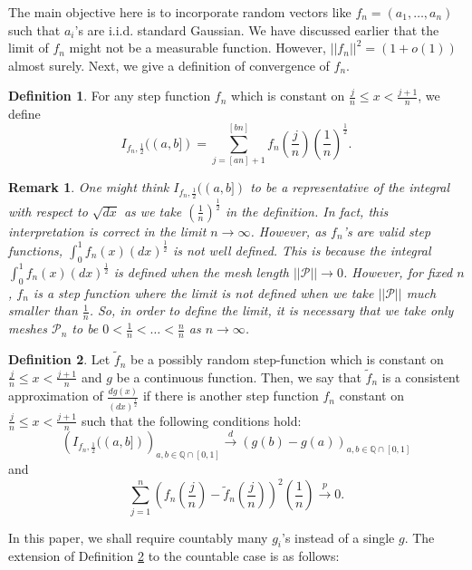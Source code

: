\documentclass[reqno,12pt]{amsart}
\theoremstyle{plain}
\newtheorem{remark}{Remark}
\theoremstyle{definition}
\newtheorem{definition}{Definition}
\let\tilde\widetilde
\begin{document}
\noindent 
The main objective here is to incorporate random vectors like $f_{n}=(a_{1},\ldots, a_{n})$ such that $a_{i}$'s are i.i.d. standard Gaussian. We have discussed earlier that the limit of $f_{n}$ might not be a measurable function. However, $|| f_{n} ||^2=(1+o(1))$ almost surely. Next, we give a definition of convergence of $f_{n}$. 
\begin{definition}
For any step function $f_{n}$ which is constant on $\frac{j}{n}\le x < \frac{j+1}{n}$, we define 
\[
I_{f_{n},\frac{1}{2}}((a,b])= \sum_{j=[an]+1}^{[bn]} f_{n}\left( \frac{j}{n} \right)\left( \frac{1}{n}\right)^{\frac{1}{2}}. 
\]
\end{definition}
\begin{remark}
One might think $I_{f_{n},\frac{1}{2}}((a,b])$ to be a representative of the integral with respect to $\sqrt{dx}$ as we take $\left( \frac{1}{n} \right)^{\frac{1}{2}}$ in the definition. In fact, this interpretation is correct in the limit $n \to \infty$. However, as $f_{n}$'s are valid step functions, $\int_{0}^{1} f_{n}(x) (dx)^{\frac{1}{2}}$ is not well defined. This is because the integral $\int_{0}^{1} f_{n}(x) (dx)^{\frac{1}{2}}$ is defined when the mesh length $|| \mathcal{P} || \to 0$. However, for fixed $n$, $f_{n}$ is a step function where the limit is not defined when we take $||\mathcal{P}||$ much smaller than $\frac{1}{n}$. So, in order to define the limit, it is necessary that we take only meshes $\mathcal{P}_{n}$ to be $ 0< \frac{1}{n}< \ldots < \frac{n}{n}$ as $n \to \infty$. 
\end{remark}
\begin{definition}\label{def:con}
Let $\tilde{f}_{n}$ be a possibly random step-function which is constant on $\frac{j}{n}\le x < \frac{j+1}{n}$ and $g$ be a continuous function. Then, we say that $\tilde{f}_{n}$ is a consistent approximation of $\frac{dg(x)}{(dx)^{\frac{1}{2}}}$ if there is another step function $f_{n}$ constant on $\frac{j}{n}\le x < \frac{j+1}{n}$ such that the following conditions hold:
\[
\left( I_{f_{n},\frac{1}{2}}((a,b]) \right)_{a,b \in \mathbb{Q}\cap [0,1]} \stackrel{d}{\to} \left( g(b)-g(a) \right)_{a,b \in \mathbb{Q}\cap [0,1]}
\]
and 
\[
\sum_{j=1}^{n} \left( f_{n}\left( \frac{j}{n}\right) - \tilde{f}_{n} \left( \frac{j}{n} \right)\right)^{2} \left( \frac{1}{n} \right) \stackrel{p}{\to} 0.
\]
\end{definition}
In this paper, we shall require countably many $g_{i}$'s instead of a single $g$. The extension of Definition \ref{def:con} to the countable case is as follows:
\end{document}
